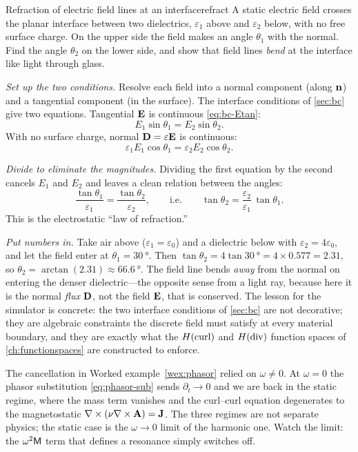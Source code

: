 \begin{workedexample}{Refraction of electric field lines at an interface}{refract}
A static electric field crosses the planar interface between two dielectrics,
$\varepsilon_1$ above and $\varepsilon_2$ below, with no free surface charge.
On the upper side the field makes an angle $\theta_1$ with the normal. Find the
angle $\theta_2$ on the lower side, and show that field lines \emph{bend} at the
interface like light through glass.

\emph{Set up the two conditions.} Resolve each field into a normal component
(along $\mathbf{n}$) and a tangential component (in the surface). The interface
conditions of \cref{sec:bc} give two equations. Tangential $\mathbf{E}$ is continuous
\eqref{eq:bc-Etan}:
\[
  E_1\sin\theta_1 = E_2\sin\theta_2.
\]
With no surface charge, normal $\mathbf{D}=\varepsilon\mathbf{E}$ is continuous:
\[
  \varepsilon_1 E_1\cos\theta_1 = \varepsilon_2 E_2\cos\theta_2.
\]

\emph{Divide to eliminate the magnitudes.} Dividing the first equation by the
second cancels $E_1$ and $E_2$ and leaves a clean relation between the angles:
\begin{equation}
  \frac{\tan\theta_1}{\varepsilon_1} = \frac{\tan\theta_2}{\varepsilon_2},
  \qquad\text{i.e.}\qquad
  \tan\theta_2 = \frac{\varepsilon_2}{\varepsilon_1}\,\tan\theta_1.
  \label{eq:refract}
\end{equation}
This is the electrostatic ``law of refraction.''

\emph{Put numbers in.} Take air above ($\varepsilon_1=\varepsilon_0$) and a
dielectric below with $\varepsilon_2=4\varepsilon_0$, and let the field enter at
$\theta_1=\SI{30}{\degree}$. Then $\tan\theta_2 = 4\tan\SI{30}{\degree} =
4\times 0.577 = 2.31$, so $\theta_2 = \arctan(2.31)\approx\SI{66.6}{\degree}$.
The field line bends \emph{away} from the normal on entering the denser
dielectric---the opposite sense from a light ray, because here it is the normal
\emph{flux} $\mathbf{D}$, not the field $\mathbf{E}$, that is conserved. The lesson for the
simulator is concrete: the two interface conditions of \cref{sec:bc} are not
decorative; they are algebraic constraints the discrete field must satisfy at
every material boundary, and they are exactly what the $H(\mathrm{curl})$ and $H(\mathrm{div})$
function spaces of \cref{ch:functionspaces} are constructed to enforce.
\end{workedexample}

\begin{pitfall}
The cancellation in Worked example~\ref{wex:phasor} relied on $\omega\neq0$. At $\omega=0$ the
phasor substitution \eqref{eq:phasor-sub} sends $\partial_t\to0$ and we are back
in the static regime, where the mass term vanishes and the curl--curl equation
degenerates to the magnetostatic $\nabla\times(\nu\nabla\times\mathbf{A})=\mathbf{J}$. The three regimes are
not separate physics; the static case is the $\omega\to0$ limit of the harmonic
one. Watch the limit: the $\omega^2\mathsf{M}$ term that defines a resonance simply
switches off.
\end{pitfall}

